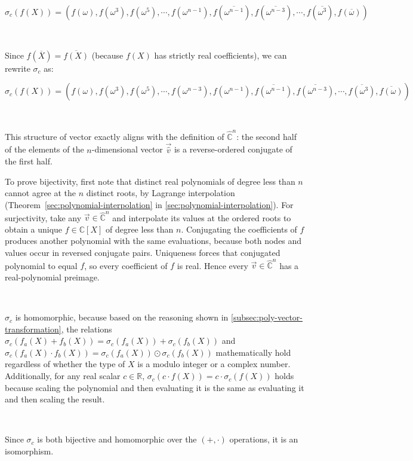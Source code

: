 $\sigma_c(f(X)) = (f(\omega),f(\omega^3),f(\omega^5), \cdots, f(\omega^{n-1}), f(\overline{\omega^{n-1}}), f(\overline{\omega^{n-3}}), \cdots, f(\overline{\omega^3}), f(\overline{\omega}))$

$ $

Since $f(\overline{X}) = \overline{f(X)}$ (because $f(X)$ has strictly real coefficients), we can rewrite $\sigma_c$ as: 

$\sigma_c(f(X)) = (f(\omega),f(\omega^3),f(\omega^5), \cdots, f(\omega^{n-3}), f(\omega^{n-1}), \overline{f(\omega^{n-1})}, \overline{f(\omega^{n-3})}, \cdots, \overline{f(\omega^3)}, \overline{f(\omega)})$

$ $

This structure of vector exactly aligns with the definition of $\hat{\mathbb{C}}^n$: the second half of the elements of the $n$-dimensional vector $\vec{\hat v}$ is a reverse-ordered conjugate of the first half.

To prove bijectivity, first note that distinct real polynomials of degree less than $n$ cannot agree at the $n$ distinct roots, by Lagrange interpolation (Theorem~\ref*{sec:polynomial-interpolation} in \autoref{sec:polynomial-interpolation}). For surjectivity, take any $\vec v\in\hat{\mathbb C}^n$ and interpolate its values at the ordered roots to obtain a unique $f\in\mathbb C[X]$ of degree less than $n$. Conjugating the coefficients of $f$ produces another polynomial with the same evaluations, because both nodes and values occur in reversed conjugate pairs. Uniqueness forces that conjugated polynomial to equal $f$, so every coefficient of $f$ is real. Hence every $\vec v\in\hat{\mathbb C}^n$ has a real-polynomial preimage.

$ $

 $\sigma_c$ is homomorphic, because based on the reasoning shown in \autoref{subsec:poly-vector-transformation}, the relations $\sigma_c(f_a(X) + f_b(X)) = \sigma_c(f_a(X)) + \sigma_c(f_b(X))$ and $\sigma_c(f_a(X) \cdot f_b(X)) = \sigma_c(f_a(X)) \odot \sigma_c(f_b(X))$ mathematically hold regardless of whether the type of $X$ is a modulo integer or a complex number. Additionally, for any real scalar $c \in \mathbb{R}$, $\sigma_c(c \cdot f(X)) = c \cdot \sigma_c(f(X))$ holds because scaling the polynomial and then evaluating it is the same as evaluating it and then scaling the result.

$ $

Since $\sigma_c$ is both bijective and homomorphic over the $(+, \cdot)$ operations, it is an isomorphism. 


